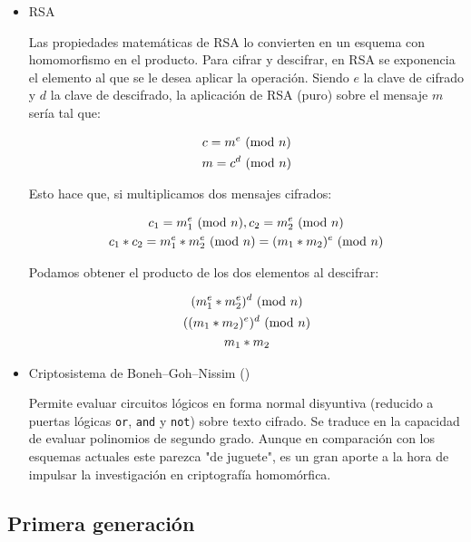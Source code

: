\begin{itemize}

    \item RSA
    
    Las propiedades matemáticas de RSA lo convierten en un esquema con homomorfismo en el producto. Para cifrar y descifrar, en RSA se exponencia el elemento al que se le desea aplicar la operación. Siendo $e$ la clave de cifrado y $d$ la clave de descifrado, la aplicación de RSA (puro) sobre el mensaje $m$ sería tal que:
    
    \begin{gather*}
        c = m^e \ (\mathrm{mod}\ n) \\
        m = c^d \ (\mathrm{mod}\ n)
    \end{gather*}
    
    Esto hace que, si multiplicamos dos mensajes cifrados:
    
    \begin{gather*}
        c_1 = m_1^e \ (\mathrm{mod}\ n), c_2 = m_2^e \ (\mathrm{mod}\ n) \\
        c_1 * c_2 = m_1^e * m_2^e \ (\mathrm{mod}\ n) = (m_1*m_2)^e \ (\mathrm{mod}\ n) 
    \end{gather*}
    
    Podamos obtener el producto de los dos elementos al descifrar:
    
    \begin{gather*}
        \label{form:rsa_product}
        (m_1^e * m_2^e)^d \ (\mathrm{mod}\ n) \\
        ((m_1*m_2)^e)^d \ (\mathrm{mod}\ n) \\
        m_1 * m_2
    \end{gather*}
    
    \item Criptosistema de Boneh–Goh–Nissim (\cite{hutchison_evaluating_2005})
    
    Permite evaluar circuitos lógicos en forma normal disyuntiva (reducido a puertas lógicas \verb|or|, \verb|and| y \verb|not|) sobre texto cifrado. Se traduce en la capacidad de evaluar polinomios de segundo grado. Aunque en comparación con los esquemas actuales este parezca "de juguete", es un gran aporte a la hora de impulsar la investigación en criptografía homomórfica. 
    
\end{itemize}

\subsection{Primera generación}

